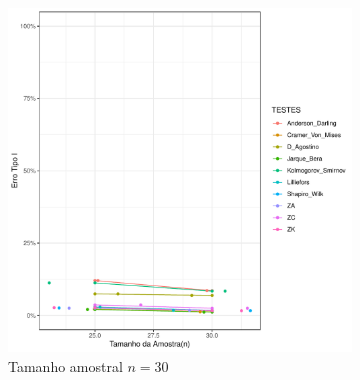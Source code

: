\documentclass[a4paper,11pt]{article} %
\begin{document}

\begin{figure}[H]
    \centering
    \caption{Comparação do Erro Tipo I dos testes AD, CM, DG, LL, JB, KS, LL, ZA, ZC e ZK em função do tamanho amostral para a \textbf{Distribuição} $\textbf{Cauchy}(0, 1)$.}
    \label{fig:erro_tipo_I_dist_cauchy}
    
    \begin{subfigure}[b]{0.45\textwidth}
        \centering
    \includegraphics[width=\textwidth]{Distribuição Cauchy/Erro Tipo I/erro_tipo_I_cauchy_30.pdf}
        \caption{Tamanho amostral \(n = 30\)}
        \label{fig:cauchy_30}
    \end{subfigure}
    \hfill
    \begin{subfigure}[b]{0.45\textwidth}
        \centering

\end{subfigure}
\end{figure}
\end{document}
